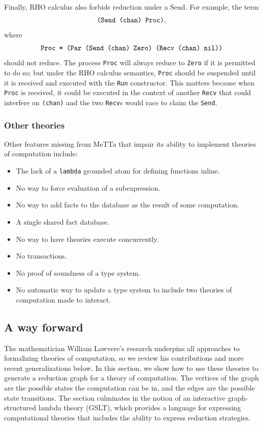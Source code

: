 \documentclass{article}
\begin{document}
Finally, RHO calculus also forbids reduction under a Send.  For example, the term 
\[\mbox{\tt(Send (chan) Proc)},\]
where
\[\mbox{\tt Proc = (Par (Send (chan) Zero) (Recv (chan) nil))}\]
should not reduce.  The process \verb+Proc+ will always reduce to \verb+Zero+ if it is permitted to do so; but under the RHO calculus semantics, \verb+Proc+ should be suspended until it is received and executed with the \verb+Run+ constructor.  This matters because when \verb+Proc+ is received, it could be executed in the context of another \verb+Recv+ that could interfere on \verb+(chan)+ and the two \verb+Recv+s would race to claim the \verb+Send+.

\subsubsection{Other theories}

Other features missing from MeTTa that impair its ability to implement theories of computation include:
\begin{itemize}
    \item The lack of a \verb+lambda+ grounded atom for defining functions inline.
    \item No way to force evaluation of a subexpression.
    \item No way to add facts to the database as the result of some computation.
    \item A single shared fact database.
    \item No way to have theories execute concurrently.
    \item No transactions.
    \item No proof of soundness of a type system.
    \item No automatic way to update a type system to include two theories of computation made to interact.
\end{itemize}

\subsection{A way forward}
\label{A way forward}

The mathematician William Lawvere's research underpins all approaches to formalizing theories of computation, so we review his contributions and more recent generalizations below.  In this section, we show how to use these theories to generate a reduction graph for a theory of computation.  The vertices of the graph are the possible states the computation can be in, and the edges are the possible state transitions.  The section culminates in the notion of an interactive graph-structured lambda theory (GSLT), which provides a language for expressing computational theories that includes the ability to express reduction strategies.  
\end{document}
